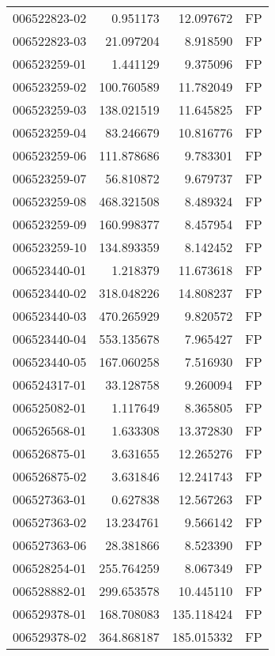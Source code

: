 \begin{tabular}{lrrl}
006522823-02 &    0.951173 &      12.097672 &   FP \\
006522823-03 &   21.097204 &       8.918590 &   FP \\
006523259-01 &    1.441129 &       9.375096 &   FP \\
006523259-02 &  100.760589 &      11.782049 &   FP \\
006523259-03 &  138.021519 &      11.645825 &   FP \\
006523259-04 &   83.246679 &      10.816776 &   FP \\
006523259-06 &  111.878686 &       9.783301 &   FP \\
006523259-07 &   56.810872 &       9.679737 &   FP \\
006523259-08 &  468.321508 &       8.489324 &   FP \\
006523259-09 &  160.998377 &       8.457954 &   FP \\
006523259-10 &  134.893359 &       8.142452 &   FP \\
006523440-01 &    1.218379 &      11.673618 &   FP \\
006523440-02 &  318.048226 &      14.808237 &   FP \\
006523440-03 &  470.265929 &       9.820572 &   FP \\
006523440-04 &  553.135678 &       7.965427 &   FP \\
006523440-05 &  167.060258 &       7.516930 &   FP \\
006524317-01 &   33.128758 &       9.260094 &   FP \\
006525082-01 &    1.117649 &       8.365805 &   FP \\
006526568-01 &    1.633308 &      13.372830 &   FP \\
006526875-01 &    3.631655 &      12.265276 &   FP \\
006526875-02 &    3.631846 &      12.241743 &   FP \\
006527363-01 &    0.627838 &      12.567263 &   FP \\
006527363-02 &   13.234761 &       9.566142 &   FP \\
006527363-06 &   28.381866 &       8.523390 &   FP \\
006528254-01 &  255.764259 &       8.067349 &   FP \\
006528882-01 &  299.653578 &      10.445110 &   FP \\
006529378-01 &  168.708083 &     135.118424 &   FP \\
006529378-02 &  364.868187 &     185.015332 &   FP \\

\end{tabular}
